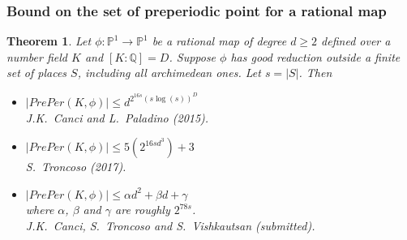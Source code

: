 \documentclass{beamer}
\def\jump{ \quad \\ \vspace{0.5cm} \pause}
\def\PP{{\mathbb P}}
\def\QQ{{\mathbb Q}}
\theoremstyle{thmstyle}
\newtheorem*{mythm}{Theorem}
\theoremstyle{mystyle}
\theoremstyle{qstnstyle}
\begin{document}





\begin{frame}
\frametitle{Bound on the set of preperiodic point for a rational map} 
\begin{mythm}


Let $\phi : \PP^1\to\PP^1$ be a rational map of degree $d\geq{2}$
defined over a number field $K$ and $[K: \mathbb{Q}]=D$. 
Suppose $\phi$ has good reduction outside a finite set of places $S$, including all archimedean ones. Let $s=|S|$. Then \pause
\begin{itemize}

\item $|PrePer(K,\phi)|\leq  d^{2^{16s}\left(s\log(s)\right)^D}$
 \\ J.K.\ Canci and L.\ Paladino (2015).\jump
\item $|PrePer(K,\phi)|\leq 5\left(2^{16sd^3}\right)+3$
 \\ S.\ Troncoso (2017).\jump
\item $|PrePer(K,\phi)|\leq \alpha d^2+\beta d+\gamma$ \\  where $\alpha$, $\beta$ and $\gamma$ are roughly $2^{78s}$.
\\ J.K.\ Canci, S.\ Troncoso and S.\ Vishkautsan (submitted).

\end{itemize}
\end{mythm}
\end{frame}
\end{document}
